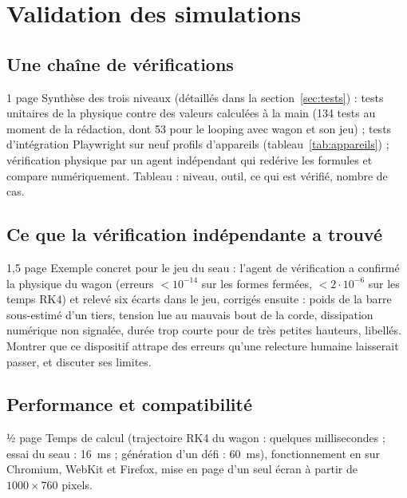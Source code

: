 
\chapter{Validation des simulations}
\label{chap:validation}

\section{Une chaîne de vérifications}

\begin{arediger}{1 page}
Synthèse des trois niveaux (détaillés dans la section~\ref{sec:tests}) :
tests unitaires de la physique contre des valeurs calculées à la main
(134 tests au moment de la rédaction, dont 53 pour le looping avec wagon et
son jeu) ; tests d'intégration Playwright sur neuf profils d'appareils
(tableau~\ref{tab:appareils}) ; vérification physique par un agent
indépendant qui redérive les formules et compare numériquement. Tableau :
niveau, outil, ce qui est vérifié, nombre de cas.
\end{arediger}

\section{Ce que la vérification indépendante a trouvé}

\begin{arediger}{1,5 page}
Exemple concret pour le jeu du seau : l'agent de vérification a confirmé la
physique du wagon (erreurs \(< 10^{-14}\) sur les formes fermées, \(< 2 \cdot 10^{-6}\)
sur les temps RK4) et relevé six écarts dans le jeu, corrigés ensuite : poids
de la barre sous-estimé d'un tiers, tension lue au mauvais bout de la corde,
dissipation numérique non signalée, durée trop courte pour de très petites
hauteurs, libellés. Montrer que ce dispositif attrape des erreurs qu'une
relecture humaine laisserait passer, et discuter ses limites.
\end{arediger}

\section{Performance et compatibilité}

\begin{arediger}{½ page}
Temps de calcul (trajectoire RK4 du wagon : quelques millisecondes ; essai du
seau : \SI{16}{ms} ; génération d'un défi : \SI{60}{ms}), fonctionnement en
 sur Chromium, WebKit et Firefox, mise en page d'un seul écran
à partir de \(1000 \times 760\) pixels.
\end{arediger}
